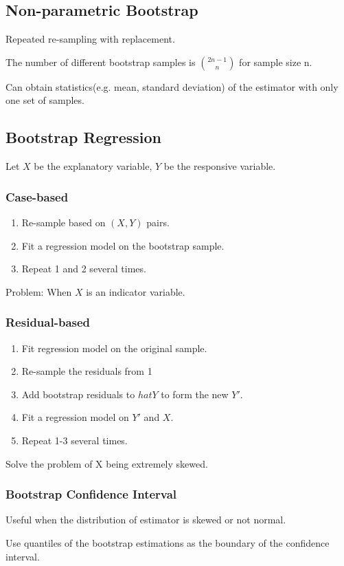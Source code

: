 \documentclass[10pt,landscape, fleqn]{article}
\begin{document}
\begin{multicols}{3}
			\subsection{Non-parametric Bootstrap}
				Repeated re-sampling with replacement. \par 
				The number of different bootstrap samples is ${2n-1 \choose n}$ for sample size n. \par 
				Can obtain statistics(e.g. mean, standard deviation) of the estimator with only one set of samples. \par
			\subsection{Bootstrap Regression}
   			    Let $X$ be the explanatory variable, $Y$ be the responsive variable.
				\subsubsection{Case-based}
					\begin{enumerate}
						\item Re-sample based on $(X, Y)$ pairs. 
						\item Fit a regression model on the bootstrap sample.
						\item Repeat 1 and 2 several times.
					\end{enumerate}
					Problem: When $X$ is an indicator variable.
				\subsubsection{Residual-based}
					\begin{enumerate}
						\item Fit  regression model on the original sample. 
						\item Re-sample the residuals from 1 
						\item Add bootstrap residuals to $hat{Y}$ to form the new $Y'$.
						\item Fit a regression model on $Y'$ and $X$.
						\item Repeat 1-3 several times.
					\end{enumerate}
					Solve the problem of X being extremely skewed.
				\subsubsection{Bootstrap Confidence Interval}
					Useful when the distribution of estimator is skewed or not normal. \par
					Use quantiles of the bootstrap estimations as the boundary of the confidence interval.

\end{multicols}
\end{document}
